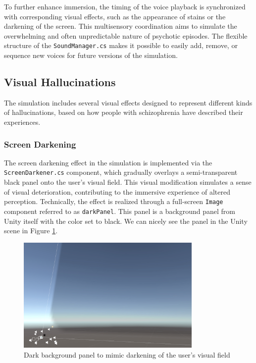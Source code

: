 \vspace{1em}
To further enhance immersion, the timing of the voice playback is synchronized with corresponding visual effects, such as the appearance of stains or the darkening of the screen. This multisensory coordination aims to simulate the overwhelming and often unpredictable nature of psychotic episodes. The flexible structure of the \texttt{SoundManager.cs} makes it possible to easily add, remove, or sequence new voices for future versions of the simulation.

\subsection{Visual Hallucinations}

The simulation includes several visual effects designed to represent different kinds of hallucinations, based on how people with schizophrenia have described their experiences. 

\subsubsection{Screen Darkening}

The screen darkening effect in the simulation is implemented via the \texttt{ScreenDarkener.cs} component, which gradually overlays a semi-transparent black panel onto the user's visual field. This visual modification simulates a sense of visual deterioration, contributing to the immersive experience of altered perception. Technically, the effect is realized through a full-screen \texttt{Image} component referred to as \texttt{darkPanel}. This panel is a background panel from Unity itself with the color set to black. We can nicely see the panel in the Unity scene in Figure \ref{fig:darkpanel}. 

\begin{figure}[h!] 
    \centering 
    \includegraphics[width=0.8\textwidth]{../../Figures/darkpanel.jpg} 
    \caption{Dark background panel to mimic darkening of the user's visual field} 
    \label{fig:darkpanel} 
\end{figure}


